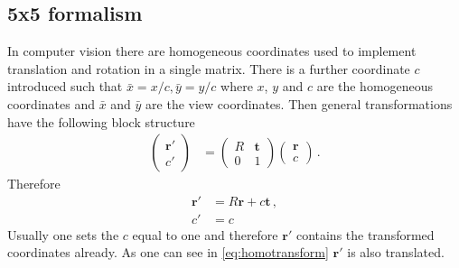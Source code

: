 \documentclass[12pt,a4paper,twoside,openright,BCOR10mm,headsepline,titlepage,abstracton,chapterprefix,final]{scrreprt}
\newcommand\Vector[1]{{\mathbf{#1}}}
\begin{document}
\subsection{5x5 formalism}
In computer vision there are homogeneous coordinates used to implement translation and rotation in a single matrix.
There is a further coordinate $c$ introduced such that $\bar{x} = x/c, \bar{y} = y/c$ where $x$, $y$ and $c$
are the homogeneous coordinates and $\bar{x}$ and $\bar{y}$ are the view coordinates. Then general transformations have the following block
structure
\begin{align}
 \begin{pmatrix} \Vector{r}' \\ c' \end{pmatrix} &= 
 \begin{pmatrix}
  R & \Vector{t} \\
  0 & 1
 \end{pmatrix}
 \begin{pmatrix}
  \Vector{r} \\ 
  c
 \end{pmatrix}\,.
\end{align}
Therefore
\begin{align}
 \Vector{r}' &= R \Vector{r} + c \Vector{t}\,,\label{eq:homotransform}\\
 c' &= c
\end{align}
Usually one sets the $c$ equal to one and therefore $\Vector{r}'$ contains
the transformed coordinates already. As one can see in \eqref{eq:homotransform}
$\Vector{r}'$ is also translated.
\end{document}
